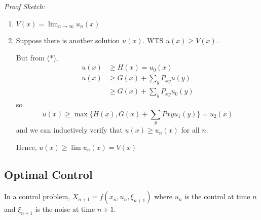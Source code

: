 \documentclass[12pt]{report}
\newenvironment*{tbox}[2][gray]{
    \begin{tcolorbox}[
        parbox=false,
        colback=#1!5!white,
        colframe=#1!75!black,
        breakable,
        title={#2}
    ]}
    {\end{tcolorbox}}
\begin{document}
    \begin{tbox}{\textbf{Proposition:} $V(x)$ is the minimal solution to the DPE }
        \emph{Proof Sketch:} 
        \begin{enumerate}
            \item $V(x) = \lim_{n \to\infty} u_n(x)$
            \item Suppose there is another solution $u(x)$. WTS $u(x) \geq V(x)$. 

            But from (*), 
            \begin{align*}
                u(x) &\geq H(x) = u_0(x)\\ 
                u(x) &\geq G(x) + \sum_y P_{xy} u(y)\\ 
                    &\geq G(x) + \sum_y P_{xy} u_0(y)
            \end{align*}
            so 
            \[u(x) \geq \max\{H(x), G(x) + \sum_y P{xy} u_1(y)\} = u_2(x)\] 
            and we can inductively verify that $u(x) \geq u_n(x)$ for all $n$.
    
            Hence, $u(x) \geq \lim u_n(x) = V(x)$
        \end{enumerate}
    \end{tbox}

\subsection*{Optimal Control}
    In a control problem, $X_{n+1} = f(x_n, u_n, \xi_{n+1})$ where $u_n$ is the control at time $n$ and $\xi_{n+1}$ is the noise at time $n+1$.
\end{document}

